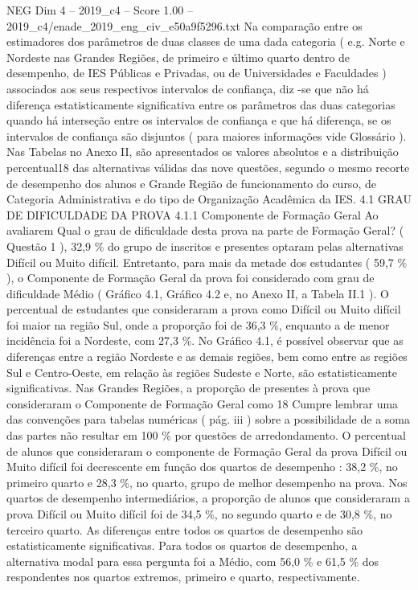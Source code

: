 \begin{textsample}{NEG Dim 4 – 2019\_c4 – Score 1.00 – 2019\_c4/enade\_2019\_eng\_civ\_e50a9f5296.txt}
Na comparação entre os estimadores dos parâmetros de duas classes de uma dada categoria ( e.g.
Norte e Nordeste nas Grandes Regiões, de primeiro e último quarto dentro de desempenho, de IES Públicas e Privadas, ou de Universidades e Faculdades ) associados aos seus respectivos intervalos de confiança, diz -se que não há diferença estatisticamente significativa entre os parâmetros das duas categorias quando há interseção entre os intervalos de confiança e que há diferença, se os intervalos de confiança são disjuntos ( para maiores informações vide Glossário ).
Nas Tabelas no Anexo II, são apresentados os valores absolutos e a distribuição percentual18 das alternativas válidas das nove questões, segundo o mesmo recorte de desempenho dos alunos e Grande Região de funcionamento do curso, de Categoria Administrativa e do tipo de Organização Acadêmica da IES. 4.1 GRAU DE DIFICULDADE DA PROVA 4.1.1 Componente de Formação Geral Ao avaliarem Qual o grau de dificuldade desta prova na parte de Formação Geral? ( Questão 1 ), 32,9 \% do grupo de inscritos e presentes optaram pelas alternativas Difícil ou Muito difícil.
Entretanto, para mais da metade dos estudantes ( 59,7 \% ), o Componente de Formação Geral da prova foi considerado com grau de dificuldade Médio ( Gráfico 4.1, Gráfico 4.2 e, no Anexo II, a Tabela II.1 ).
O percentual de estudantes que consideraram a prova como Difícil ou Muito difícil foi maior na região Sul, onde a proporção foi de 36,3 \%, enquanto a de menor incidência foi a Nordeste, com 27,3 \%.
No Gráfico 4.1, é possível observar que as diferenças entre a região Nordeste e as demais regiões, bem como entre as regiões Sul e Centro-Oeste, em relação às regiões Sudeste e Norte, são estatisticamente significativas.
Nas Grandes Regiões, a proporção de presentes à prova que consideraram o Componente de Formação Geral como 18 Cumpre lembrar uma das convenções para tabelas numéricas ( pág. iii ) sobre a possibilidade de a soma das partes não resultar em 100 \% por questões de arredondamento.
O percentual de alunos que consideraram o componente de Formação Geral da prova Difícil ou Muito difícil foi decrescente em função dos quartos de desempenho : 38,2 \%, no primeiro quarto e 28,3 \%, no quarto, grupo de melhor desempenho na prova.
Nos quartos de desempenho intermediários, a proporção de alunos que consideraram a prova Difícil ou Muito difícil foi de 34,5 \%, no segundo quarto e de 30,8 \%, no terceiro quarto.
As diferenças entre todos os quartos de desempenho são estatisticamente significativas.
Para todos os quartos de desempenho, a alternativa modal para essa pergunta foi a Médio, com 56,0 \% e 61,5 \% dos respondentes nos quartos extremos, primeiro e quarto, respectivamente.

\end{textsample}
